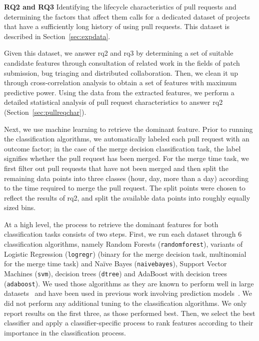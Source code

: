 \documentclass{sig-alternate}
\begin{document}
{\bfseries RQ2 and RQ3}
Identifying the lifecycle characteristics of pull requests and determining the
factors that affect them calls for a dedicated dataset of projects that have a
sufficiently long history of using pull requests. This dataset is described in
Section~\ref{sec:expdata}.

Given this dataset, we answer {\sc rq2} and {\sc rq3} by determining a set of
suitable candidate features through consultation of related work in the fields
of patch submission, bug triaging and distributed collaboration. Then, we clean
it up through cross-correlation analysis to obtain a set of features with
maximum predictive power. Using the data from the extracted features,
we perform a detailed statistical analysis of pull request characteristics to
answer {\sc rq2} (Section~\ref{sec:pullreqchar}).

Next, we use machine learning to retrieve the dominant
feature. Prior to running the classification algorithms, we automatically labeled
each pull request with an outcome factor; in the case of the \textsf{merge
decision} classification task, the label signifies whether the pull request has
been merged. For the \textsf{merge time} task, we first filter out pull requests
that have not been merged and then split the remaining data points into three
classes (\textsf{hour}, \textsf{day}, \textsf{more than a day}) according to the time
required to merge the pull request. The split points were chosen to reflect the
results of {\sc rq2}, and split the available data points into roughly equally
sized bins.

At a high level, the process to retrieve the dominant features for both
classification tasks consists of two steps.  First, we run each dataset through
6 classification algorithms, namely Random Forests (\texttt{randomforest}),
variants of Logistic Regression (\texttt{logregr}) (binary for the \textsf{merge
decision} task, multinomial for the \textsf{merge time} task) and Na\"ive Bayes
(\texttt{naivebayes}), Support Vector Machines (\texttt{svm}), decision trees
(\texttt{dtree}) and AdaBoost with decision trees (\texttt{adaboost}). We used
those algorithms as they are known to perform well in large
datasets~\cite{Lessm08} and have been used in previous work involving prediction
models~\cite{Giger12}. We did not perform any additional tuning to the
classification algorithms. We only report results on the first three, as those
performed best. Then, we select the best classifier and apply a
classifier-specific process to rank features according to their importance in
the classification process. 
\end{document}
